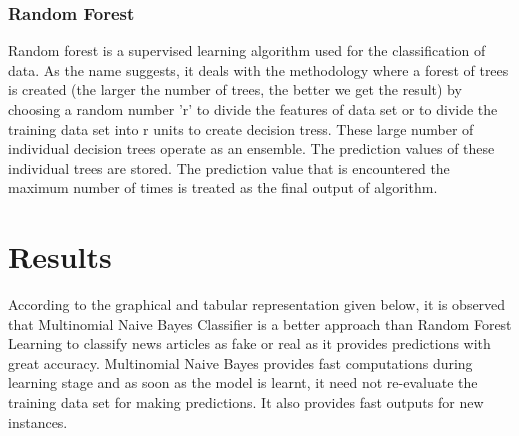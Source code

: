 \documentclass[runningheads]{llncs}
\begin{document}
\subsubsection{Random Forest}
Random forest is a supervised learning algorithm used for the classification of data. As the name suggests, it deals with the methodology where a forest of trees is created (the larger the number of trees, the better we get the result) by choosing a random number 'r'  to divide the features of data set or to divide the training data set into r units to create decision tress. These large number of individual decision trees operate as an ensemble. The prediction values of these individual trees are stored. The prediction value that is encountered the maximum number of times is treated as the final output of algorithm.




%

\section{Results}
\newline
\newline
According to the graphical and tabular representation given below, it is observed that Multinomial Naive Bayes Classifier is a better approach than Random Forest Learning to classify news articles as fake or real as it provides predictions with great accuracy.
Multinomial Naive Bayes provides fast computations during learning stage and as soon as the model is learnt, it need not re-evaluate the training data set for making predictions. It also provides fast outputs for new instances.
\end{document}

